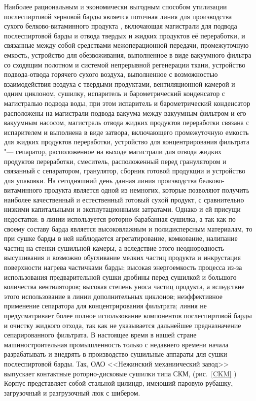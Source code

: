 {Наиболее рациональным и экономически выгодным способом утилизации послеспиртовой зерновой барды является поточная линия для производства сухого белково-витаминного продукта \cite{Patent_2217490}, включающая магистрали для подвода послеспиртовой барды и отвода твердых и жидких продуктов её переработки, и связанные между собой средствами межоперационной передачи, промежуточную емкость, устройство для обезвоживания, выполненное в виде вакуумного фильтра со сходящим полотном и системой непрерывной регенерации ткани, устройство подвода-отвода горячего сухого воздуха, выполненное с возможностью взаимодействия воздуха с твердыми продуктами, вентиляционной камерой и одним циклоном, сушилку, испаритель и барометрический конденсатор с магистралью подвода воды, при этом испаритель и барометрический конденсатор расположены на магистрали подвода вакуума между вакуумным фильтром и его вакуумным насосом, магистраль отвода жидких продуктов переработки связана с испарителем и выполнена в виде затвора, включающего промежуточную емкость для жидких продуктов переработки, устройство для концентрирования фильтрата "--- сепаратор, расположенное на выходе магистрали для отвода жидких продуктов переработки, смеситель, расположенный перед гранулятором и связанный с сепаратором, гранулятор, сборник готовой продукции и устройство для упаковки. 
На сегодняшний день данная линия производства белково-витаминного продукта является одной из немногих, которые позволяют получить наиболее качественный и естественный готовый сухой продукт, с сравнительно низкими капитальными и эксплутационными затратами. 
Однако и ей присущи недостатки: в линии используется роторно-барабанная сушилка, а так как по своему составу барда является высоковлажным и полидисперсным материалам, то при сушке барды в ней наблюдается агрегатирование, комкование, налипание частиц на стенки сушильной камеры, а вследствие этого неоднородность высушивания и возможно обугливание мелких частиц продукта и инкрустация поверхности нагрева частичками барды; высокая энергоемкость процесса из-за использования предварительной сушки дробины перед сушилкой и большого количества вентиляторов; высокая степень уноса частиц продукта, а вследствие этого использование в линии дополнительных циклонов; неэффективное применение сепаратора для концентрирования фильтрата; линия не предусматривает более полное использование компонентов послеспиртовой барды и очистку жидкого отхода, так как не указывается дальнейшее предназначение сепарированного фильтрата. 
В настоящее время в нашей стране машиностроительная промышленность только с недавнего времени начала разрабатывать и внедрять в производство сушильные аппараты для сушки послеспиртовой барды. 
Так, ОАО <<Нежинский механиический завод>> выпускает контактные роторно-дисковые сушилки типа СКМ, (рис.~\ref{CKM} ) 
Корпус представляет собой стальной цилиндр, имеюший паровую рубашку, загрузочный и разгрузочный люк с шибером. 

}
